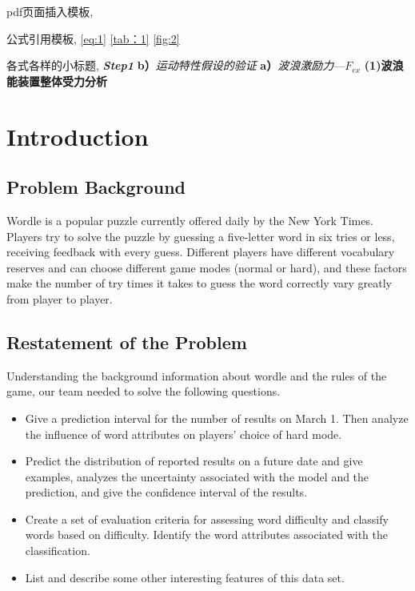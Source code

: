 \documentclass[12pt]{mcmthesis}
\begin{document}
pdf页面插入模板,
 
\newpage
 
\newpage

公式引用模板,
\ref{eq:1}
\ref{tab：1}
\ref{fig:2}

各式各样的小标题,
\textbf{\textit{Step1}}
\textbf{b）}\textit{运动特性假设的验证}
\textbf{a）}\textit{波浪激励力}—$ F_{ex} $
\textbf{(1)波浪能装置整体受力分析}

\fi
\section{Introduction}
\subsection{Problem Background}
\hspace{1.4em}Wordle is a popular puzzle currently offered daily by the New York Times. Players try to solve the puzzle by guessing a five-letter word in six tries or less, receiving feedback with every guess. Different players have different vocabulary reserves and  can choose different game modes (normal or hard), and these factors make the number of try times it takes to guess the word correctly vary greatly from player to player.
\\[0.01pt]
\subsection{Restatement of the Problem}
\hspace{1.4em}Understanding the background information about wordle and the rules of the game, our team needed to solve the following questions.
\begin{itemize}
	\item Give a prediction interval for the number of results on March 1. Then analyze the influence of word attributes on players' choice of hard mode.
	\item Predict the distribution of reported results on a future date and give examples, analyzes the uncertainty associated with the model and the prediction, and give the confidence interval of the results.
	\item Create a set of evaluation criteria for assessing word difficulty and classify words based on difficulty. Identify the word attributes associated with the classification.
	\item List and describe some other interesting features of this data set.
\end{itemize}
\end{document}
